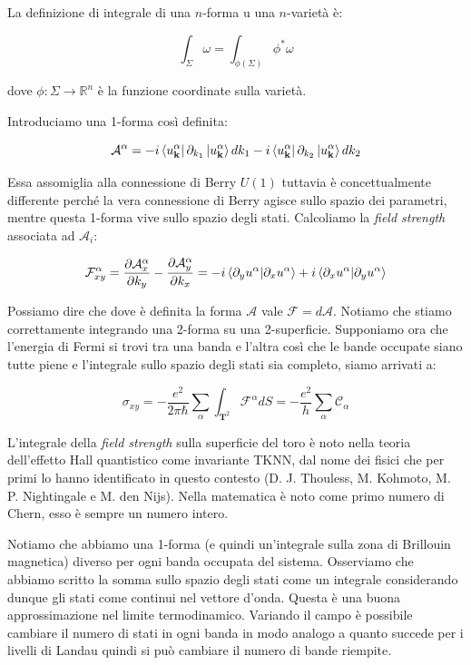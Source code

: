 \documentclass[12pt,a4paper]{article}
\begin{document}
La definizione di integrale di una $n$-forma u una $n$-varietà è:

\[ \int_{\Sigma} \omega = \int_{\phi(\Sigma)} \phi^{*} \omega\]

dove $\phi: \Sigma \rightarrow \mathbb{R}^n$ è la funzione coordinate sulla varietà. 

Introduciamo una 1-forma così definita:

\begin{equation}
\mathcal{A}^{\alpha} = -i \bra{u^{\alpha}_{\mathbf{k}}} \partial_{k_1} \ket{u^{\alpha}_{\bold{k}}} dk_1 -i \bra{u^{\alpha}_{\mathbf{k}}} \partial_{k_2} \ket{u^{\alpha}_{\bold{k}}} dk_2
\end{equation}

Essa assomiglia alla connessione di Berry $U(1)$ tuttavia è concettualmente differente perché la vera connessione di Berry agisce sullo spazio dei parametri, mentre questa 1-forma vive sullo spazio degli stati. Calcoliamo la \emph{field strength} associata ad $\mathcal{A}_i$:

\begin{equation}
\mathcal{F}^{\alpha}_{xy} = \frac{\partial \mathcal{A}^{\alpha}_{x}}{\partial k_{y}}-\frac{\partial \mathcal{A}^{\alpha}_{y}}{\partial k_{x}} = -i \braket{\partial_{y} u^{\alpha}| \partial_{x} u^{\alpha}} + i  \braket{\partial_{x} u^{\alpha}| \partial_{y} u^{\alpha}}
\end{equation}

Possiamo dire che dove è definita la forma $\mathcal{A}$ vale $\mathcal{F} = d \mathcal{A}$. Notiamo che stiamo correttamente integrando una 2-forma su una 2-superficie.
Supponiamo ora che l'energia di Fermi si trovi tra una banda e l'altra così che le bande occupate siano tutte piene e l'integrale sullo spazio degli stati sia completo, siamo arrivati a:

\begin{equation}
\sigma_{xy} = -\frac{e^2}{2 \pi \hbar} \sum_{\alpha} \int_{\mathbf{T}^2} \mathcal{F}^{\alpha} dS = -\frac{e^2}{h} \sum_{\alpha} \mathcal{C}_{\alpha}
\end{equation}

L'integrale della \emph{field strength} sulla superficie del toro è noto nella teoria dell'effetto Hall quantistico come invariante TKNN, dal nome dei fisici che per primi lo hanno identificato in questo contesto (D. J. Thouless, M. Kohmoto, M. P. Nightingale e M. den Nijs). Nella matematica è noto come primo numero di Chern, esso è sempre un numero intero.

Notiamo che abbiamo una 1-forma (e quindi un'integrale sulla zona di Brillouin magnetica) diverso per ogni banda occupata del sistema. Osserviamo che abbiamo scritto la somma sullo spazio degli stati come un integrale considerando dunque gli stati come continui nel vettore d'onda. Questa è una buona approssimazione nel limite termodinamico.
Variando il campo è possibile cambiare il numero di stati in ogni banda in modo analogo a quanto succede per i livelli di Landau quindi si può cambiare il numero di bande riempite.
\end{document}
